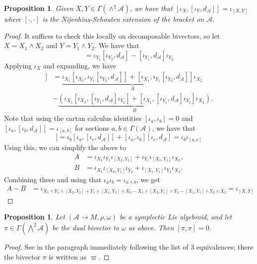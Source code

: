 \documentclass{amsart}
\newcommand{\ra}{\rightarrow}
\newtheorem{prop}[theorem]{Proposition}
\newcommand{\A}{\mathcal{A}}
\theoremstyle{definition}
\begin{document}
\begin{prop}\label{CartanWedge2}
    Given $X,Y \in \Gamma(\wedge^2 \A)$, we have that $[\iota_X, [\iota_Y,d_\A]]=\iota_{[X,Y]}$ where $[\cdot,\cdot]$ is the Nijenhius-Schouten extension of the bracket on $\A$.
\end{prop}
\begin{proof}
    It suffices to check this locally on decomposable bivectors, so let $X=X_1 \wedge X_2$ and $Y=Y_1 \wedge Y_2$. We have that
    \begin{equation*}
        [\iota_Y,d_\A] =\iota_{Y_1}[\iota_{Y_2},d_\A]-[\iota_{Y_1},d_\A]\iota_{Y_2}
    \end{equation*}
    Applying $\iota_X$ and expanding, we have
    \begin{align*}
        [\iota_X,[\iota_Y,d_\A]] &= \underbrace{\iota_{X_1}[\iota_{X_2},\iota_{Y_1}[\iota_{Y_2},d_\A]]+[\iota_{X_1},\iota_{Y_1}[\iota_{Y_2},d_\A]]\iota_{X_2}}_{A} \\
        &-\underbrace{\left( \iota_{X_1}[\iota_{X_2},[\iota_{Y_1},d_\A]\iota_{Y_2}]+[\iota_{X_1},[\iota_{Y_1},d_\A]\iota_{Y_2}]\iota_{X_2}\right)}_B.
    \end{align*}
Note that using the cartan calculus identities $[\iota_a,\iota_b]=0$ and $[\iota_a,[\iota_b,d_\A]]=\iota_{[a,b]}$ for sections $a,b \in \Gamma(\A)$, we have that
\begin{equation*}
    [\iota_a,\iota_b[\iota_c,d_\A]]= \iota_b[\iota_a,[\iota_c,d_\A]]+[\iota_a,\iota_b][\iota_c,d_\A]= \iota_b \iota_{[a,c]}
\end{equation*}
Using this, we can simplify the above to
\begin{align*}
    A&=\iota_{X_1}\iota_{Y_1}\iota_{[X_2,Y_2]}+\iota_{Y_1}\iota_{[X_1,Y_2]}\iota_{X_2}, \\
    B&=\iota_{X_1}\iota_{[X_2,Y_1]}\iota_{Y_2} + \iota_{[X_1,Y_1]}\iota_{Y_2}\iota_{X_2}.
\end{align*}
Combining these and using that $\iota_a\iota_b = \iota_{a \wedge b}$, we get
\begin{align*}
    A-B &= \iota_{X_1\wedge Y_1 \wedge [X_2,Y_2]+Y_1 \wedge [X_1,Y_2]\wedge X_2 - X_1 \wedge [X_2,Y_1]\wedge Y_2 - [X_1,Y_1]\wedge Y_2 \wedge X_2} = \iota_{[X,Y]}
\end{align*}
\end{proof}
\begin{prop}\label{PoissonBracketVanish}
    Let $(\A \ra M,\rho,\omega)$ be a symplectic Lie algebroid, and let $\pi \in \Gamma(\bigwedge^2\A)$ be the dual bivector to $\omega$ as above. Then $[\pi,\pi]=0$.
\end{prop}
\begin{proof}
 See \cite[Proof of Theorem 2.14]{nest1999deformations} in the paragraph immediately following the list of 3 equivalences; there the bivector $\pi$ is written as $\varpi$.
\end{proof}
\end{document}
